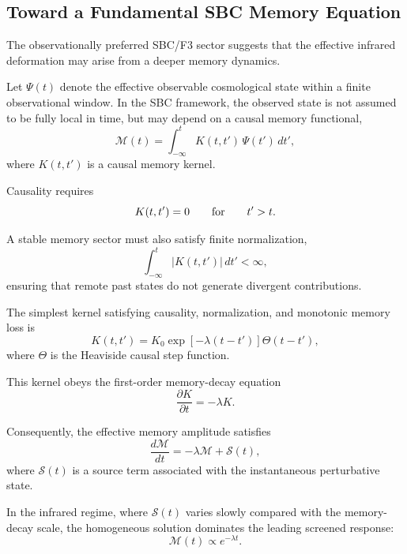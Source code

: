 \subsection{Toward a Fundamental SBC Memory Equation}

The observationally preferred SBC/F3 sector suggests that the effective infrared deformation may arise from a deeper memory dynamics.

Let \(\Psi(t)\) denote the effective observable cosmological state within a finite observational window. In the SBC framework, the observed state is not assumed to be fully local in time, but may depend on a causal memory functional,
\begin{equation}
\mathcal{M}(t)
=
\int_{-\infty}^{t}
K(t,t')\,\Psi(t')\,dt',
\end{equation}
where \(K(t,t')\) is a causal memory kernel.

Causality requires
\begin{equation}
K(t,t')=0
\qquad
{\rm for}
\qquad
t'>t .
\end{equation}

A stable memory sector must also satisfy finite normalization,
\begin{equation}
\int_{-\infty}^{t}
|K(t,t')|\,dt'
<\infty ,
\end{equation}
ensuring that remote past states do not generate divergent contributions.

The simplest kernel satisfying causality, normalization, and monotonic memory loss is
\begin{equation}
K(t,t')
=
K_0
\exp[-\lambda(t-t')]
\Theta(t-t'),
\end{equation}
where \(\Theta\) is the Heaviside causal step function.

This kernel obeys the first-order memory-decay equation
\begin{equation}
\frac{\partial K}{\partial t}
=
-\lambda K .
\end{equation}

Consequently, the effective memory amplitude satisfies
\begin{equation}
\frac{d\mathcal{M}}{dt}
=
-\lambda \mathcal{M}
+
\mathcal{S}(t),
\end{equation}
where \(\mathcal{S}(t)\) is a source term associated with the instantaneous perturbative state.

In the infrared regime, where \(\mathcal{S}(t)\) varies slowly compared with the memory-decay scale, the homogeneous solution dominates the leading screened response:
\begin{equation}
\mathcal{M}(t)
\propto
e^{-\lambda t}.
\end{equation}

